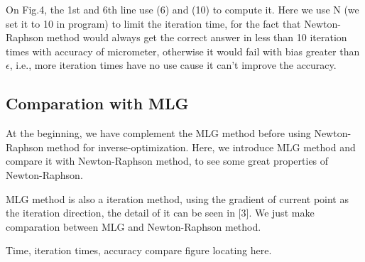 \documentclass[letterpaper, 10 pt, conference]{ieeeconf}  %
\begin{document}
On Fig.4, the 1st and 6th line use (6) and (10) to compute it. Here we use N (we set it to 10 in program) to limit the iteration time, for the fact that Newton-Raphson method would always get the correct answer in less than 10 iteration times with accuracy of micrometer, otherwise it would fail with bias greater than $\epsilon$, i.e., more iteration times have no use cause it can't improve the accuracy.  

\subsection{Comparation with MLG}

At the beginning, we have complement the MLG method before using Newton-Raphson method for inverse-optimization. Here, we introduce MLG method and compare it with Newton-Raphson method, to see some great properties of Newton-Raphson.

MLG method is also a iteration method, using the gradient of current point as the iteration direction, the detail of it can be seen in [3]. We just make comparation between MLG and Newton-Raphson method.

Time, iteration times, accuracy compare figure locating here.
\end{document}
